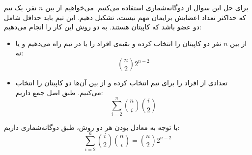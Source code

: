 \p
برای حل این سوال از دوگانه‌شماری استفاده می‌کنیم. می‌خواهیم از بین
$n$
نفر، یک تیم که حداکثر تعداد اعضایش برایمان مهم نیست، تشکیل دهیم. این تیم باید حداقل شامل دو عضو باشد که کاپیتان هستند. به دو روش این کار را انجام می‌دهیم:
\begin{itemize}
\item
از بین 
$n$
نفر دو کاپیتان را انتخاب کرده و بقیه‌ی افراد را یا در تیم راه می‌دهیم و یا نه:
$$\binom{n}{2}2^{n-2}$$
\item
تعدادی از افراد را برای تیم انتخاب کرده و از بین آن‌ها دو کاپیتان را انتخاب می‌کنیم. طبق اصل جمع داریم:
$$\sum_{i=2}^{n}\binom{n}{i}\binom{i}{2}$$
\end{itemize}
با توجه به معادل بودن هر دو روش، طبق دوگانه‌شماری داریم:
$$\sum_{i=2}^{n}\binom{i}{2}\binom{n}{i} = \binom{n}{2}2^{n-2}$$
